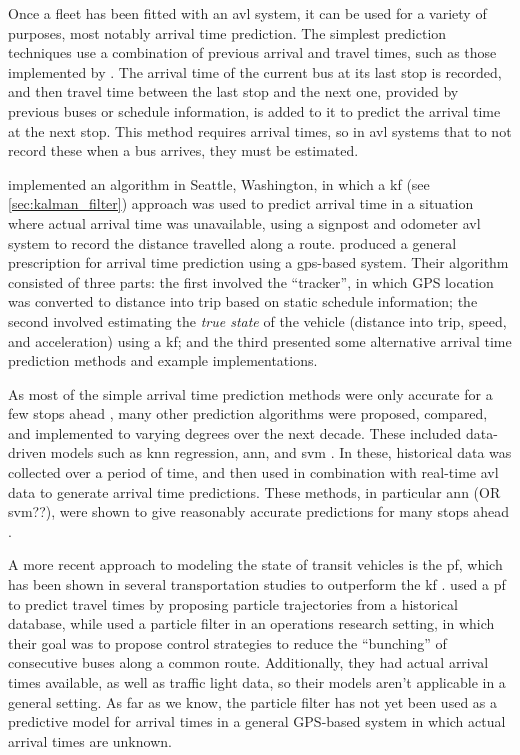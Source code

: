 \documentclass[12pt,a4paper]{article}
\begin{document}
Once a fleet has been fitted with an \gls{avl} system, 
it can be used for a variety of purposes, most notably arrival time prediction.
The simplest prediction techniques use a combination of previous arrival and travel times,
such as those implemented by \cite{cn}.
The arrival time of the current bus at its last stop is recorded, 
and then travel time between the last stop and the next one, 
provided by previous buses or schedule information,
is added to it to predict the arrival time at the next stop.
This method requires arrival times, so in \gls{avl} systems that to not record
these when a bus arrives, they must be estimated.


\cite{dailey:2001} implemented an algorithm in Seattle, Washington,
in which a \gls{kf} (see \cref{sec:kalman_filter}) 
approach was used to predict arrival time in a situation where
actual arrival time was unavailable,
using a signpost and odometer \gls{avl} system to record the distance travelled along a route.
\cite{cathey-dailey:2003} produced a general prescription for arrival time prediction using
a \gls{gps}-based system.
Their algorithm consisted of three parts:
the first involved the ``tracker'', in which GPS location was converted to distance into trip
based on static schedule information;
the second involved estimating the \emph{true state} of the vehicle (distance into trip, speed, 
and acceleration) using a \gls{kf};
and the third presented some alternative arrival time prediction methods and example implementations.


As most of the simple arrival time prediction methods were only accurate for
a few stops ahead \citep{cn},
many other prediction algorithms were proposed, compared, and implemented
to varying degrees over the next decade.
These included data-driven models such as \gls{knn} regression,
\gls{ann}, and \gls{svm} 
\citep{chang-etal:2010,jeong-rilett:2005,yu-etal:2006,yu-etal:2010,yu-etal:2011}.
In these, historical data was collected over a period of time,
and then used in combination with
real-time \gls{avl} data to generate arrival time predictions.
These methods, in particular \gls{ann} (OR \gls{svm}??),
were shown to give reasonably accurate predictions for many stops ahead 
\citep{cn}.


A more recent approach to modeling the state of transit vehicles is the \gls{pf},
which has been shown in several transportation studies to outperform the \gls{kf}
\citep{chen-rakha:2014,cn}.
\cite{chen-rakha:2014} used a \gls{pf} to predict travel times 
by proposing particle trajectories from a historical database,
while \cite{hans-etal:2015} used a particle filter in an operations research setting,
in which their goal was to propose control strategies to reduce the ``bunching''
of consecutive buses along a common route.
Additionally, they had actual arrival times available, as well as traffic light data,
so their models aren't applicable in a general setting.
As far as we know, the particle filter has not yet been used as a predictive model for arrival times
in a general GPS-based system in which actual arrival times are unknown.
\end{document}
